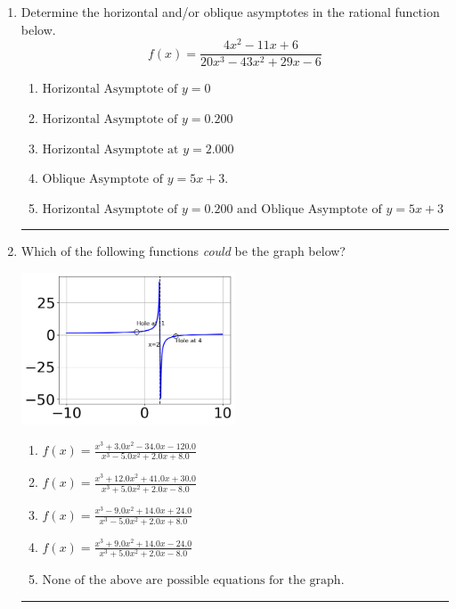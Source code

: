 \documentclass[14pt]{extbook}
\newcommand{\litem}[1]{\item#1\hspace*{-1cm}\rule{\textwidth}{0.4pt}}
\begin{document}
\begin{enumerate}
{\begin{enumerate}[label=\Alph*.]
\end{enumerate} }
\litem{
Determine the horizontal and/or oblique asymptotes in the rational function below.\[ f(x) = \frac{4x^{2} -11 x + 6}{20x^{3} -43 x^{2} +29 x -6} \]\begin{enumerate}[label=\Alph*.]
\item \( \text{Horizontal Asymptote of } y = 0 \)
\item \( \text{Horizontal Asymptote of } y = 0.200  \)
\item \( \text{Horizontal Asymptote at } y = 2.000 \)
\item \( \text{Oblique Asymptote of } y = 5x + 3. \)
\item \( \text{Horizontal Asymptote of } y = 0.200 \text{ and Oblique Asymptote of } y = 5x + 3 \)

\end{enumerate} }
\litem{
Which of the following functions \textit{could} be the graph below?
\begin{center}
    \includegraphics[width=0.5\textwidth]{../Figures/identifyGraphOfRationalFunctionC.png}
\end{center}
\begin{enumerate}[label=\Alph*.]
\item \( f(x)=\frac{x^{3} +3.0 x^{2} -34.0 x -120.0}{x^{3} -5.0 x^{2} +2.0 x + 8.0} \)
\item \( f(x)=\frac{x^{3} +12.0 x^{2} +41.0 x + 30.0}{x^{3} +5.0 x^{2} +2.0 x -8.0} \)
\item \( f(x)=\frac{x^{3} -9.0 x^{2} +14.0 x + 24.0}{x^{3} -5.0 x^{2} +2.0 x + 8.0} \)
\item \( f(x)=\frac{x^{3} +9.0 x^{2} +14.0 x -24.0}{x^{3} +5.0 x^{2} +2.0 x -8.0} \)
\item \( \text{None of the above are possible equations for the graph.} \)


\end{enumerate}}
\end{enumerate}
\end{document}
